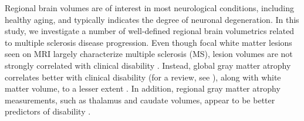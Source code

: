 Regional brain volumes are of interest in most neurological conditions, including healthy aging, and typically indicates the degree of neuronal degeneration. In this study, we investigate a number of well-defined regional brain volumetrics related to multiple sclerosis disease progression. Even though focal white matter lesions seen on MRI largely characterize multiple sclerosis (MS), lesion volumes are not strongly correlated with clinical disability \cite{lesions1,lesions2,lesions3}. Instead, global gray matter atrophy correlates better with clinical disability (for a review, see \cite{horakova2012clinical}), along with white matter volume, to a lesser extent \cite{white1}. In addition, regional gray matter atrophy measurements, such as thalamus \cite{thal1,thal2,thal3,thal4} and caudate \cite{caud1,caud2} volumes, appear to be better predictors of disability \cite{gm1,gm2,gm3,gm4}.   %
